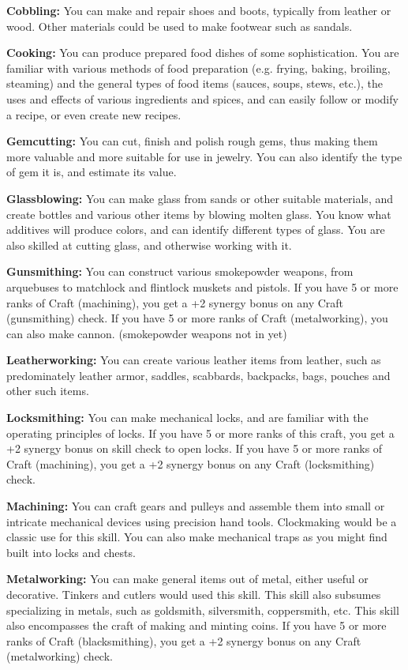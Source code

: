 \begin{itemize*}
	\item \textbf{Cobbling:} You can make and repair shoes and boots, typically from leather or wood. Other materials could be used to make footwear such as sandals.
	\item \textbf{Cooking:} You can produce prepared food dishes of some sophistication. You are familiar with various methods of food preparation (e.g. frying, baking, broiling, steaming) and the general types of food items (sauces, soups, stews, etc.), the uses and effects of various ingredients and spices, and can easily follow or modify a recipe, or even create new recipes.
	\item \textbf{Gemcutting:} You can cut, finish and polish rough gems, thus making them more valuable and more suitable for use in jewelry. You can also identify the type of gem it is, and estimate its value.
	\item \textbf{Glassblowing:} You can make glass from sands or other suitable materials, and create bottles and various other items by blowing molten glass. You know what additives will produce colors, and can identify different types of glass. You are also skilled at cutting glass, and otherwise working with it.
	\item \textbf{Gunsmithing:} You can construct various smokepowder weapons, from arquebuses to matchlock and flintlock muskets and pistols. If you have 5 or more ranks of Craft (machining), you get a +2 synergy bonus on any Craft (gunsmithing) check. If you have 5 or more ranks of Craft (metalworking), you can also make cannon. (smokepowder weapons not in yet)
	\item \textbf{Leatherworking:} You can create various leather items from leather, such as predominately leather armor, saddles, scabbards, backpacks, bags, pouches and other such items.
	\item \textbf{Locksmithing:} You can make mechanical locks, and are familiar with the operating principles of locks. If you have 5 or more ranks of this craft, you get a +2 synergy bonus on  skill check to open locks. If you have 5 or more ranks of Craft (machining), you get a +2 synergy bonus on any Craft (locksmithing) check.
	\item \textbf{Machining:} You can craft gears and pulleys and assemble them into small or intricate mechanical devices using precision hand tools. Clockmaking would be a classic use for this skill. You can also make mechanical traps as you might find built into locks and chests.
	\item \textbf{Metalworking:} You can make general items out of metal, either useful or decorative. Tinkers and cutlers would used this skill. This skill also subsumes specializing in metals, such as goldsmith, silversmith, coppersmith, etc. This skill also encompasses the craft of making and minting coins. If you have 5 or more ranks of Craft (blacksmithing), you get a +2 synergy bonus on any Craft (metalworking) check.

\end{itemize*}

